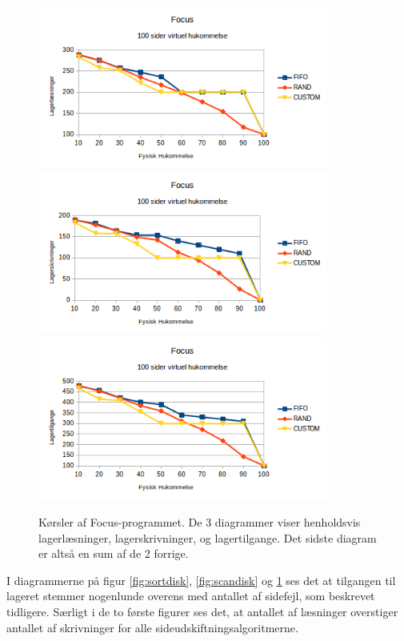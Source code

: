 \begin{figure}[H]
	\centering
	\includegraphics[width=0.85\textwidth]{figures/FocusReads.png}	\includegraphics[width=0.85\textwidth]{figures/FocusWrites.png}	\includegraphics[width=0.85\textwidth]{figures/FocusAccess.png}
	\caption{Kørsler af Focus-programmet. De 3 diagrammer viser henholdsvis lagerlæsninger, lagerskrivninger, og lagertilgange. Det sidste diagram er altså en sum af de 2 forrige.}
	\label{fig:focusdisk}
\end{figure}

I diagrammerne på figur \ref{fig:sortdisk}, \ref{fig:scandisk} og \ref{fig:focusdisk} ses det at tilgangen til lageret stemmer nogenlunde overens med antallet af sidefejl, som beskrevet tidligere. Særligt i de to første figurer ses det, at antallet af læsninger overstiger antallet af skrivninger for alle sideudskiftningsalgoritmerne.